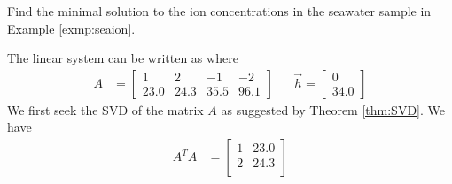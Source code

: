 \begin{exmp}
Find the minimal solution to the ion concentrations in the seawater sample in Example \ref{exmp:seaion}.
\end{exmp}
\begin{solution}
The linear system can be written as  where
\begin{align*}
A &= 
\begin{bmatrix}
1 & 2 & -1 & -2 \\
23.0 & 24.3 & 35.5 & 96.1    
\end{bmatrix}
& & \vec{h} =
\begin{bmatrix}
0 \\
34.0
\end{bmatrix}
\end{align*}
We first seek the SVD of the matrix $A$ as suggested by Theorem \ref{thm:SVD}. We have
\begin{align*}
A^TA &=
\begin{bmatrix}
1 & 23.0 \\
2 & 24.3 \\

\end{bmatrix}
\end{align*}
\end{solution}
